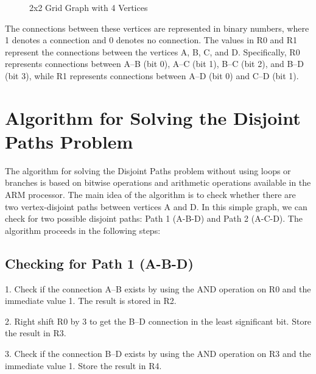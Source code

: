 \begin{figure}[h]
\centering
{}
\caption{2x2 Grid Graph with 4 Vertices}
\end{figure}

The connections between these vertices are represented in binary numbers, where 1 denotes a connection and 0 denotes no connection. The values in R0 and R1 represent the connections between the vertices A, B, C, and D. Specifically, R0 represents connections between A--B (bit 0), A--C (bit 1), B--C (bit 2), and B--D (bit 3), while R1 represents connections between A--D (bit 0) and C--D (bit 1).

\section{Algorithm for Solving the Disjoint Paths Problem}

The algorithm for solving the Disjoint Paths problem without using loops or branches is based on bitwise operations and arithmetic operations available in the ARM processor. The main idea of the algorithm is to check whether there are two vertex-disjoint paths between vertices A and D. In this simple graph, we can check for two possible disjoint paths: Path 1 (A-B-D) and Path 2 (A-C-D). The algorithm proceeds in the following steps:

\subsection{Checking for Path 1 (A-B-D)}

1. Check if the connection A--B exists by using the AND operation on R0 and the immediate value 1. The result is stored in R2.

2. Right shift R0 by 3 to get the B--D connection in the least significant bit. Store the result in R3.

3. Check if the connection B--D exists by using the AND operation on R3 and the immediate value 1. Store the result in R4.

